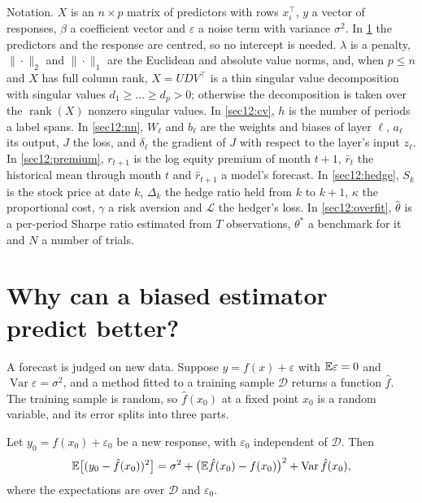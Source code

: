 \begin{chapterrefs}
\begin{keybox}
Notation. $X$ is an $n\times p$ matrix of predictors with rows $x_i^\top$, $y$ a vector of responses,
$\beta$ a coefficient vector and $\varepsilon$ a noise term with variance $\sigma^2$. In
\cref{sec12:reg} the predictors and the response are centred, so no intercept is needed. $\lambda$ is a
penalty, $\|\cdot\|_2$ and $\|\cdot\|_1$ are the Euclidean and absolute value norms, and, when $p\le n$ and $X$ has
full column rank, $X=UDV^\top$ is a thin singular value decomposition with singular values
$d_1\ge\dots\ge d_p>0$; otherwise the decomposition is taken over the $\operatorname{rank}(X)$ nonzero
singular values. In \cref{sec12:cv}, $h$ is the
number of periods a label spans. In \cref{sec12:nn}, $W_\ell$ and $b_\ell$ are the weights and biases of
layer $\ell$, $a_\ell$ its output, $J$ the loss, and $\delta_\ell$ the gradient of $J$ with respect to the layer's
input $z_\ell$. In \cref{sec12:premium}, $r_{t+1}$ is the log equity premium of month $t+1$, $\bar r_t$ the
historical mean through month $t$ and $\hat r_{t+1}$ a model's forecast. In \cref{sec12:hedge}, $S_k$ is
the stock price at date $k$, $\Delta_k$ the hedge ratio held from $k$ to $k+1$, $\kappa$ the proportional
cost, $\gamma$ a risk aversion and $\mathcal L$ the hedger's loss. In \cref{sec12:overfit}, $\hat\theta$ is a per-period Sharpe
ratio estimated from $T$ observations, $\theta^*$ a benchmark for it and $N$ a number of trials.
\end{keybox}

\FloatBarrier
\section{Why can a biased estimator predict better?}
\label{sec12:reg}

A forecast is judged on new data. Suppose $y=f(x)+\varepsilon$ with $\mathbb{E}\varepsilon=0$ and
$\operatorname{Var}\varepsilon=\sigma^2$, and a method fitted to a training sample $\mathcal D$ returns a
function $\hat f$. The training sample is random, so $\hat f(x_0)$ at a fixed point $x_0$ is a random
variable, and its error splits into three parts.

\begin{proposition}\label{prop12:bv}
Let $y_0=f(x_0)+\varepsilon_0$ be a new response, with $\varepsilon_0$ independent of $\mathcal D$. Then
\begin{equation}\label{eq12:bv}
  \mathbb{E}\bigl[(y_0-\hat f(x_0))^2\bigr]=\sigma^2+\bigl(\mathbb{E}\hat f(x_0)-f(x_0)\bigr)^2+\operatorname{Var}\hat f(x_0),
\end{equation}
where the expectations are over $\mathcal D$ and $\varepsilon_0$.
\end{proposition}


\end{chapterrefs}
